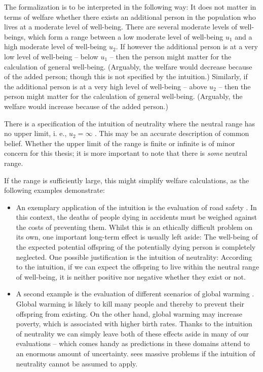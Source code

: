 The formalization is to be interpreted in the following way: It does not matter in terms of welfare whether there exists an additional person in the population who lives at a moderate level of well-being. There are several moderate levels of well-beings, which form a range between a low moderate level of well-being $u_1$ and a high moderate level of well-being $u_2$. If however the additional person is at a very low level of well-being – below $u_1$ – then the person might matter for the calculation of general well-being. (Arguably, the welfare would decrease because of the added person; though this is not specified by the intuition.) Similarly, if the additional person is at a very high level of well-being – above $u_2$ – then the person might matter for the calculation of general well-being. (Arguably, the welfare would increase because of the added person.) 

There is a specification of the intuition of neutrality where the neutral range has no upper limit, i. e., $u_2=\infty$ \cite[p.~113]{broome_2012}. This may be an accurate description of common belief. Whether the upper limit of the range is finite or infinite is of minor concern for this thesis; it is more important to note that there is \emph{some} neutral range. 

If the range is sufficiently large, this might simplify welfare calculations, as the following examples demonstrate:

\begin{itemize}
\item An exemplary application of the intuition is the evaluation of road safety \cite[p.~144f]{broome_2004}. In this context, the deaths of people dying in accidents must be weighed against the costs of preventing them. Whilst this is an ethically difficult problem on its own, one important long-term effect is usually left aside: The well-being of the expected potential offspring of the potentially dying person is completely neglected. One possible justification is the intuition of neutrality: According to the intuition, if we can expect the offspring to live within the neutral range of well-being, it is neither positive nor negative whether they exist or not.
\item A second example is the evaluation of different scenarios of global warming \cite[p.~170]{broome_2012}. Global warming is likely to kill many people and thereby to prevent their offspring from existing. On the other hand, global warming may increase poverty, which is associated with higher birth rates. Thanks to the intuition of neutrality we can simply leave both of these effects aside in many of our evaluations – which comes handy as predictions in these domains attend to an enormous amount of uncertainty.  sees massive problems if the intuition of neutrality cannot be assumed to apply.
\end{itemize}

